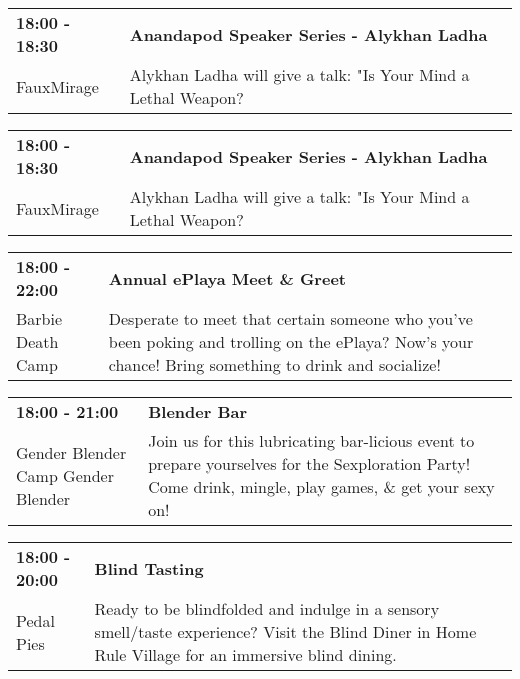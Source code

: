 \begin{tabular}{ p{1in} p{2.2in} }
    \textbf{18:00 - 18:30} & \textbf{Anandapod Speaker Series - Alykhan Ladha} \\
    FauxMirage \newline  & Alykhan Ladha will give a talk:  "Is Your Mind a Lethal Weapon? \\
    \hline 
\end{tabular}
    
\begin{tabular}{ p{1in} p{2.2in} }
    \textbf{18:00 - 18:30} & \textbf{Anandapod Speaker Series - Alykhan Ladha} \\
    FauxMirage \newline  & Alykhan Ladha will give a talk: "Is Your Mind a Lethal Weapon? \\
    \hline 
\end{tabular}
    
\begin{tabular}{ p{1in} p{2.2in} }
    \textbf{18:00 - 22:00} & \textbf{Annual ePlaya Meet \& Greet} \\
    Barbie Death Camp \newline  & Desperate to meet that certain someone who you've been poking and trolling on the ePlaya?  Now's your chance! Bring something to drink and socialize! \\
    \hline 
\end{tabular}
    
\begin{tabular}{ p{1in} p{2.2in} }
    \textbf{18:00 - 21:00} & \textbf{Blender Bar} \\
    Gender Blender \newline Camp Gender Blender & Join us for this lubricating bar-licious event to prepare yourselves for the Sexploration Party! Come drink, mingle, play games, \& get your sexy on! \\
    \hline 
\end{tabular}
    
\begin{tabular}{ p{1in} p{2.2in} }
    \textbf{18:00 - 20:00} & \textbf{Blind Tasting} \\
    Pedal Pies \newline  & Ready to be blindfolded and indulge in a sensory smell/taste experience? Visit the Blind Diner in Home Rule Village for an immersive blind dining. \\
    \hline 
\end{tabular}
    
